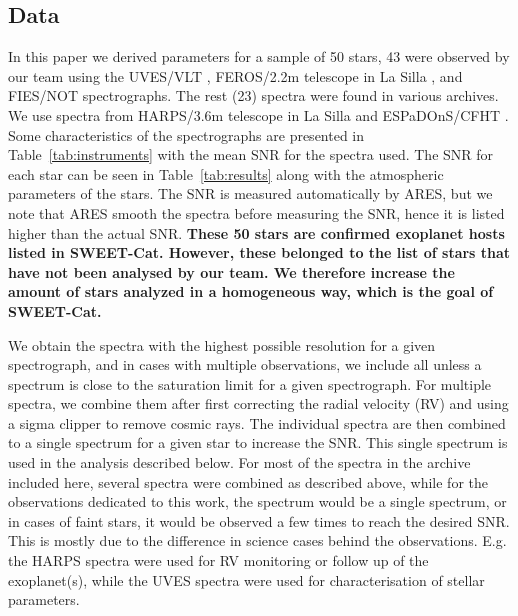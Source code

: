 \documentclass{aa}
\begin{document}
\subsection{Data}
\label{sec:data}
In this paper we derived parameters for a sample of 50 stars, 43 were observed
by our team using the UVES/VLT \citep{UVES}, FEROS/2.2m telescope in La Silla
\citep{FEROS}, and FIES/NOT \citep{FIES} spectrographs. The rest (23) spectra
were found in various archives. We use spectra from HARPS/3.6m telescope in La
Silla \citep{HARPS} and ESPaDOnS/CFHT \citep{ESPADONS}. Some characteristics of
the spectrographs are presented in Table~\ref{tab:instruments} with the mean SNR
for the spectra used. The SNR for each star can be seen in
Table~\ref{tab:results} along with the atmospheric parameters of the stars. The
SNR is measured automatically by ARES, but we note that ARES smooth the spectra
before measuring the SNR, hence it is listed higher than the actual SNR.  {\bf
These 50 stars are confirmed exoplanet hosts listed in SWEET-Cat. However, these
belonged to the list of stars that have not been analysed by our team. We
therefore increase the amount of stars analyzed in a homogeneous way, which is
the goal of SWEET-Cat.}

We obtain the spectra with the highest possible resolution for a given
spectrograph, and in cases with multiple observations, we include all unless a
spectrum is close to the saturation limit for a given spectrograph. For multiple
spectra, we combine them after first correcting the radial velocity (RV) and
using a sigma clipper to remove cosmic rays. The individual spectra are then
combined to a single spectrum for a given star to increase the SNR. This single
spectrum is used in the analysis described below. For most of the spectra in the
archive included here, several spectra were combined as described above, while
for the observations dedicated to this work, the spectrum would be a single
spectrum, or in cases of faint stars, it would be observed a few times to reach
the desired SNR. This is mostly due to the difference in science cases behind
the observations. E.g. the HARPS spectra were used for RV monitoring or follow
up of the exoplanet(s), while the UVES spectra were used for characterisation of
stellar parameters.
\end{document}
